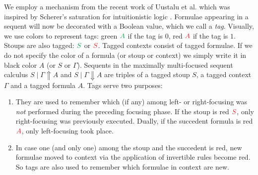 \documentclass[runningheads]{llncs}
\newcommand{\red}[1]{{\color{Red}#1}}
\newcommand{\green}[1]{{\color{Green}#1}}
\newcommand{\up}{\Uparrow}
\newcommand{\dn}{\Downarrow}
\begin{document}
We employ a mechanism from the recent work of Uustalu et al. \cite{UVW:protsn} which was inspired by Scherer's saturation for intuitionistic logic \cite{scherer:simple:2015}. Formulae appearing in a sequent will now be decorated with a Boolean value, which we call a \emph{tag}. Visually, we use colors to represent tags: green $\green{A}$ if the tag is $0$, red $\red{A}$ if the tag is $1$.
Stoups are also tagged: $\green{S}$ or $\red{S}$. Tagged contexts consist of tagged formulae. If we do not specify the color of a formula (or stoup or context) we simply write it in black color $A$ (or $S$ or $\Gamma$). Sequents in the maximally multi-focused sequent calculus $S \mid \Gamma \up A$ and $S \mid \Gamma \dn A$ are triples of a tagged stoup $S$, a tagged context $\Gamma$ and a tagged formula $A$. Tags serve two purposes:
\begin{enumerate}
\item They are used to remember which (if any) among left- or right-focusing was \emph{not} performed during the preceding focusing phase. If the stoup is red $\red{S}$, only right-focusing was previously executed. Dually, if the succedent formula is red $\red{A}$, only left-focusing took place. \item In case one (and only one) among the stoup and the succedent is red, new formulae moved to context via the application of invertible rules become red. So tags are also used to remember which formulae in context are new.
\end{enumerate}
\end{document}
